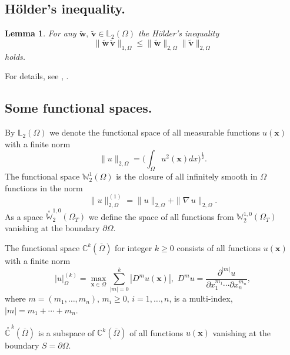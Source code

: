 \documentclass{article}
\theoremstyle{plain}
\newtheorem{lemma}[theorem]{Lemma}
\theoremstyle{definition}
\numberwithin{equation}{section}
\begin{document}
\subsection{H\"{o}lder's inequality.} 

\begin{lemma}\label{l2.10}
For any $\widetilde{\boldsymbol{w}},\,\widetilde{\boldsymbol{v}}\in\mathbb{L}_{2}(\Omega)$ the H\"{o}lder's inequality  
\begin{equation}\label{eq2.9}
\|\widetilde{\boldsymbol{w}}\,\widetilde{\boldsymbol{v}}\|_{1,\Omega}\leqslant
\|\widetilde{\boldsymbol{w}}\|_{2,\Omega}\|\widetilde{\boldsymbol{v}}\|_{2,\Omega}
\end{equation}
holds.
\end{lemma}
For details, see \cite{5}, \cite{21}.

\subsection{Some functional spaces.}

By $\mathbb{L}_{2}(\Omega)$ we denote the functional space of all measurable functions
$u(\boldsymbol{x})$ with a finite norm
\begin{equation*}
\|u\|_{2,\Omega}=\big(\int_{\Omega}u^{2}(\boldsymbol{x})dx\big)^{\frac{1}{2}}.
\end{equation*}
The functional space $\mathbb{W}^{1}_{2}(\Omega)$ is the closure of all infinitely smooth in $\Omega$ functions in the norm
\begin{equation*}
\|u\|^{(1)}_{2,\Omega}=\|u\|_{2,\Omega}+\|\nabla\,u\|_{2,\Omega}.
\end{equation*}
As a space $\stackrel{\!\!\circ}{\mathbb{W}}^{1,0}_{2}(\Omega_{T})$ we define the space of all functions from
$\mathbb{W}^{1,0}_{2}(\Omega_{T})$ vanishing at the boundary $\partial{\Omega}$.

The functional space $\mathbb{C}^{k}(\overline{\Omega})$ for integer $k\geqslant 0$ consists of all
functions $u(\boldsymbol{x})$ with a finite norm
\begin{equation*}
|u|^{(k)}_{\Omega}=\max_{\boldsymbol{x}\in \Omega}\sum_{|m|=0}^{k}|D^{m}u(\boldsymbol{x})|,\,\,
D^{m}u=\frac{\partial^{|m|}u}{\partial x_{1}^{m_{1}}\cdots\partial x_{n}^{m_{n}}},
\end{equation*}
where $m=(m_{1},\ldots,m_{n}),\,m_{i}\geqslant 0,\,i=1,\ldots,n$, is a multi-index,
$|m|=m_{1}+\cdots+m_{n}$.

$\stackrel{\,\!\!\circ}{\mathbb{C}}^{\,k}(\overline{\Omega})$ is a subspace of
$\mathbb{C}^{k}(\overline{\Omega})$ of all functions $u(\boldsymbol{x})$ vanishing at the boundary $S=\partial\Omega$.
\end{document}
